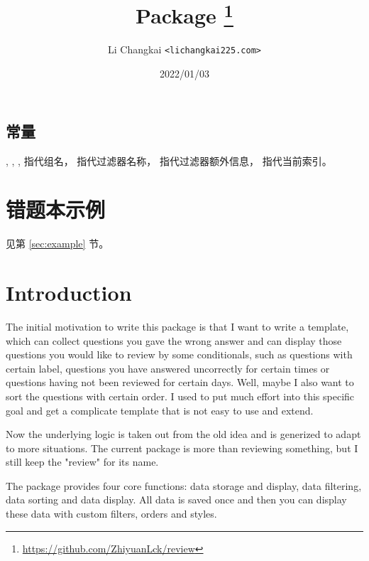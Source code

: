 \documentclass[full]{l3doc}
\begin{document}
\begin{documentation}
\subsection{常量}

\begin{function}{\rvGroup, \rvFilterName, \rvFilterInfo, \rvIndex}
   指代组名， 指代过滤器名称，
  指代过滤器额外信息， 指代当前索引。
\end{function}

\section{错题本示例}
见第 \ref{sec:example} 节。

\title{
  Package 
  \protect\footnote{\url{https://github.com/ZhiyuanLck/review}}
}
\author{Li Changkai \texttt{<lichangkai225\@qq.com>}}
\date{2022/01/03}
\maketitle

\section{Introduction}

The initial motivation to write this package is that I want to write a
template, which can collect questions you gave the wrong answer and can
display those questions you would like to review by some conditionals, such as
questions with certain label, questions you have answered uncorrectly for
certain times or questions having not been reviewed for certain days. Well,
maybe I also want to sort the questions with certain order. I used to put much
effort into this specific goal and get a complicate template that is not easy
to use and extend.

Now the underlying logic is taken out from the old idea and is generized to
adapt to more situations. The current package is more than reviewing something,
but I still keep the "review" for its name.

The package provides four core functions: data storage and display, data
filtering, data sorting and data display. All data is saved once and then you
can display these data with custom filters, orders and styles.


\end{documentation}
\end{document}
